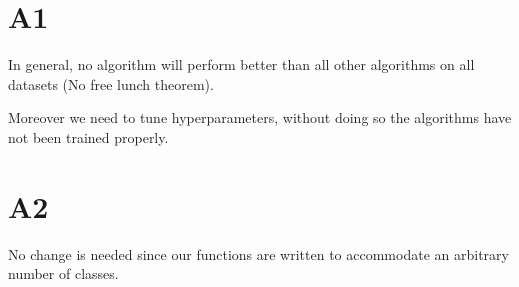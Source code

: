 \documentclass[12pt, a4paper]{article}
\begin{document}
\section*{A1}
In general, no algorithm will perform better than all other algorithms on all datasets (No free lunch theorem).\par
\bigskip
Moreover we need to tune hyperparameters, without doing so the algorithms have not been trained properly.

\section*{A2}
No change is needed since our functions are written to accommodate an arbitrary number of classes.
\end{document}

